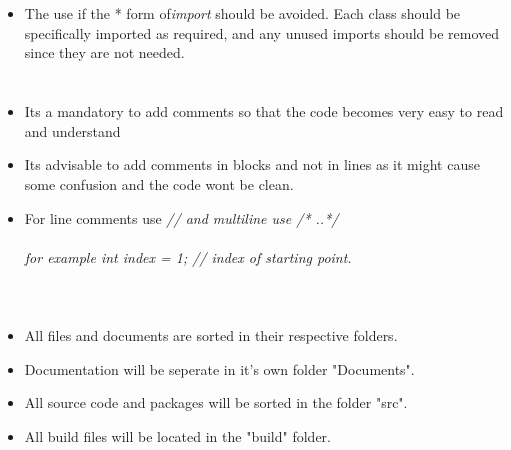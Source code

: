 \documentclass[12pt]{article}
\begin{document}
	\section{\bfseries\selectfont{Imports}}
	\begin{itemize}
		\item The use if the * form of{\it import} should be avoided. Each class should be specifically imported as required, and any unused imports should be removed since they are not needed.
		
	\end{itemize}
	
	\section{\bfseries\selectfont{General Commenting}}
	\begin{itemize}
		\item Its a mandatory to add comments so that the code becomes very easy to read and understand
		\item Its advisable to add comments in blocks and not in lines as it might cause some confusion and the code wont be clean.
		\item For line comments use {\it // and multiline use /* ..*/}\\\\
		{\it for example int index  = 1; // index of starting point.}\\\\
		
	\end{itemize}
	
	\section{\bfseries\selectfont{Github File Structure}}
	\begin{itemize}
	\item All files and documents are sorted in their respective folders.
	\item Documentation will be seperate in it's own folder "Documents".
	\item All source code and packages will be sorted in the folder "src".
	\item All build files will be located in the "build" folder.
	\end{itemize}
		
\end{document}
